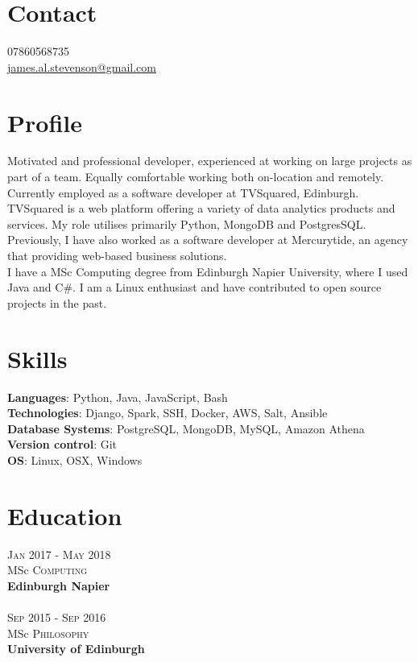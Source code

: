 \documentclass[14pt, a4paper]{extarticle}
\begin{document}
\par{\bigskip\par
\section{Contact}
\large
07860568735\\
\href{mailto:james.al.stevenson@gmail.com}{james.al.stevenson@gmail.com}\\
}

\begin{multicols}{2}

\section{Profile}
\noindent Motivated and professional developer, experienced at working on large projects as part of a team. Equally comfortable working both on-location and remotely.\\
Currently employed as a software developer at TVSquared, Edinburgh. TVSquared is a web platform offering a variety of data analytics products and services. My role utilises primarily Python, MongoDB and PostgresSQL.\\
Previously, I have also worked as a software developer at Mercurytide, an agency that providing web-based business solutions.\\
I have a MSc Computing degree from Edinburgh Napier University, where I used Java and C\#. I am a Linux enthusiast and have contributed to open source projects in the past.

\section{Skills}
\noindent\textbf{Languages}: Python, Java, JavaScript, Bash\\
\textbf{Technologies}: Django, Spark, SSH, Docker, AWS, Salt, Ansible\\
\textbf{Database Systems}: PostgreSQL, MongoDB, MySQL, Amazon Athena\\
\textbf{Version control}: Git\\
\textbf{OS}: Linux, OSX, Windows

\section{Education}
\noindent\textsc{Jan} 2017 - \textsc{May} 2018\\
MSc \textsc{Computing} \\
\textbf{Edinburgh Napier}\\~\\
\textsc{Sep} 2015 - \textsc{Sep} 2016\\
MSc \textsc{Philosophy} \\
\textbf{University of Edinburgh}


\end{multicols}
\end{document}
